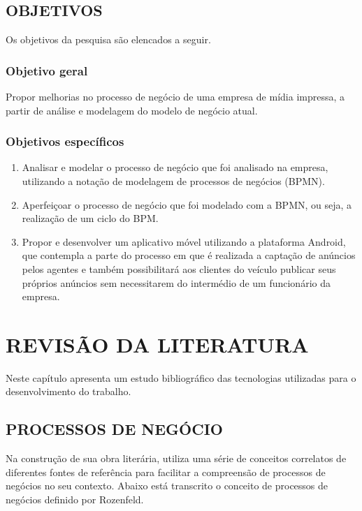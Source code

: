 \documentclass[
	12pt,				%
	openright,			%
	oneside,			%
	a4paper,			%
	chapter=TITLE,		%
	section=TITLE,		%
	english,			%
	french,				%
	spanish,			%
	brazil				%
	]{abntex2}
\begin{document}
\section{OBJETIVOS}

Os objetivos da pesquisa são elencados a seguir.

\subsection{Objetivo geral}

Propor melhorias no processo de negócio de uma empresa de mídia impressa, a partir de análise e modelagem do modelo de negócio atual.

\subsection{Objetivos específicos}

\begin{enumerate}[label=\itshape\alph*\upshape)]
	\item Analisar e modelar o processo de negócio que foi analisado na empresa, utilizando a notação de modelagem de processos de negócios (BPMN).
	\item	Aperfeiçoar o processo de negócio que foi modelado com a BPMN, ou seja, a realização de um ciclo do BPM.
	\item	Propor e desenvolver um aplicativo móvel utilizando a plataforma Android, que contempla a parte do processo em que é realizada a captação de anúncios pelos agentes e também possibilitará aos clientes do veículo publicar seus próprios anúncios sem necessitarem do intermédio de um funcionário da empresa. 
	
\end{enumerate}

\chapter{REVISÃO DA LITERATURA}\label{cap-revisao}
Neste capítulo apresenta um estudo bibliográfico das tecnologias utilizadas para o desenvolvimento do trabalho.

\section{PROCESSOS DE NEGÓCIO}
Na construção de sua obra literária,  utiliza uma série de conceitos correlatos de diferentes fontes de referência para facilitar a compreensão de processos de negócios no seu contexto. Abaixo está transcrito o conceito de processos de negócios definido por Rozenfeld.
\end{document}
